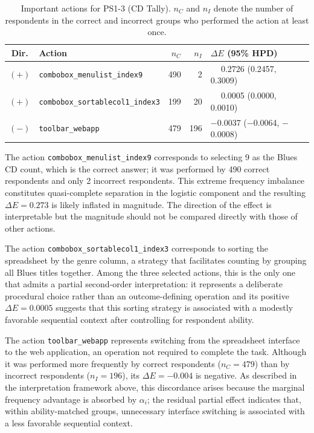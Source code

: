 \begin{table}[htb]
\centering
\small
\begin{tabular}{clrrl}
\toprule
Dir. & Action & $n_C$ & $n_I$ & $\Delta E$ (95\% HPD) \\
\midrule
$(+)$ & \texttt{combobox\_menulist\_index9}     & 490 &   2 & $\phantom{-}$0.2726 (0.2457, 0.3009) \\
$(+)$ & \texttt{combobox\_sortablecol1\_index3} & 199 &  20 & $\phantom{-}$0.0005 (0.0000, 0.0010) \\
$(-)$ & \texttt{toolbar\_webapp}               & 479 & 196 & $-$0.0037 ($-$0.0064, $-$0.0008) \\
\bottomrule
\end{tabular}

\caption{Important actions for PS1-3 (CD Tally). $n_C$ and $n_I$ denote the number of respondents in the correct and incorrect groups who performed the action at least once.}
\label{tab:ps13_actions}
\end{table}

The action \texttt{combobox\_menulist\_index9} corresponds to selecting 9 as the Blues CD count, which is the correct answer; it was performed by 490 correct respondents and only 2 incorrect respondents. This extreme frequency imbalance constitutes quasi-complete separation in the logistic component and the resulting $\Delta E = 0.273$ is likely inflated in magnitude. The direction of the effect is interpretable but the magnitude should not be compared directly with those of other actions.

The action \texttt{combobox\_sortablecol1\_index3} corresponds to sorting the spreadsheet by the genre column, a strategy that facilitates counting by grouping all Blues titles together. Among the three selected actions, this is the only one that admits a partial second-order interpretation: it represents a deliberate procedural choice rather than an outcome-defining operation and its positive $\Delta E = 0.0005$ suggests that this sorting strategy is associated with a modestly favorable sequential context after controlling for respondent ability.

The action \texttt{toolbar\_webapp} represents switching from the spreadsheet interface to the web application, an operation not required to complete the task. Although it was performed more frequently by correct respondents ($n_C = 479$) than by incorrect respondents ($n_I = 196$), its $\Delta E = -0.004$ is negative. As described in the interpretation framework above, this discordance arises because the marginal frequency advantage is absorbed by $\alpha_i$; the residual partial effect indicates that, within ability-matched groups, unnecessary interface switching is associated with a less favorable sequential context.

